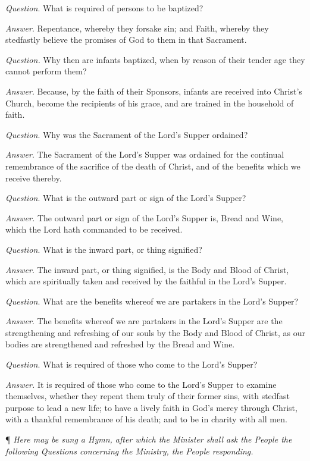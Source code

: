 \emph{Question}. What is required of persons to be
baptized?

\emph{Answer}. Repentance, whereby they forsake sin;
and Faith, whereby they stedfastly believe the promises of God to them
in that Sacrament.

\emph{Question.} Why then are infants baptized, when
by reason of their tender age they cannot perform them?

\emph{Answer}. Because, by the faith of their Sponsors,
infants are received into Christ's Church, become the recipients of his
grace, and are trained in the household of faith.

\emph{Question}. Why was the Sacrament of the Lord's
Supper ordained?

\emph{Answer}. The Sacrament of the Lord's Supper
was ordained for the continual remembrance of the sacrifice of the death
of Christ, and of the benefits which we receive thereby.

\emph{Question}. What is the outward part or sign
of the Lord's Supper?

\emph{Answer.} The outward part or sign of the Lord's
Supper is, Bread and Wine, which the Lord hath commanded to be received.

\emph{Question}. What is the inward part, or thing
signified?

\emph{Answer}. The inward part, or thing signified,
is the Body and Blood of Christ, which are spiritually taken and received
by the faithful in the Lord's Supper.

\emph{Question}. What are the benefits whereof we
are partakers in the Lord's Supper?

\emph{Answer}. The benefits whereof we are partakers
in the Lord’s Supper are the strengthening and refreshing of our
souls by the Body and Blood of Christ, as our bodies are strengthened
and refreshed by the Bread and Wine.

\emph{Question}. What is required of those who come
to the Lord's Supper?

\emph{Answer.} It is required of those who come to
the Lord's Supper to examine themselves, whether they repent them truly
of their former sins, with stedfast purpose to lead a new life; to have
a lively faith in God's mercy through Christ, with a thankful remembrance
of his death; and to be in charity with all men.

¶
\emph{Here may be sung a Hymn, after which the Minister shall ask the
People the following Questions concerning the Ministry, the People responding.}

